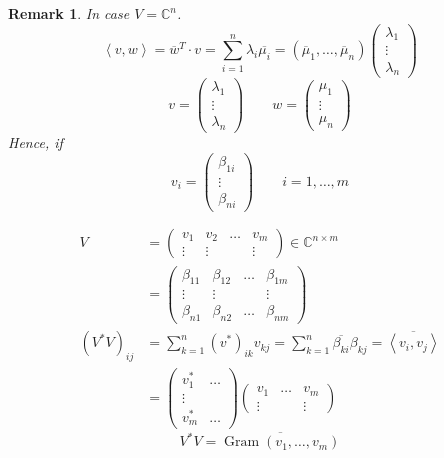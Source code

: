 \documentclass[a4paper]{article}
\newcounter{lecref}[section]
\numberwithin{lecref}{section}
\newtheorem{remark}[lecref]{Remark}
\newcommand{\ip}[2]{\left\langle#1,#2\right\rangle} %
\begin{document}
\begin{remark} %
  In case $V = \mathbb C^n$.
  \[ \ip vw = \overline{w}^T \cdot v = \sum_{i=1}^n \lambda_i \overline{\mu_i} = (\overline \mu_1, \ldots, \overline \mu_n)\begin{pmatrix} \lambda_1 \\ \vdots \\ \lambda_n \end{pmatrix} \]
  \[ v = \begin{pmatrix} \lambda_1 \\ \vdots \\ \lambda_n \end{pmatrix} \qquad w = \begin{pmatrix} \mu_1 \\ \vdots \\ \mu_n \end{pmatrix} \]
  Hence, if
  \[ v_i = \begin{pmatrix} \beta_{1i} \\ \vdots \\ \beta_{ni} \end{pmatrix} \qquad i = 1, \ldots, m \]

  \begin{align*}
    V &= \begin{pmatrix} v_1 & v_2 & \ldots & v_m \\ \vdots & \vdots & & \vdots \end{pmatrix} \in \mathbb C^{n \times m} \\
      &= \begin{pmatrix} \beta_{11} & \beta_{12} & \ldots & \beta_{1m} \\ \vdots & \vdots & & \vdots \\ \beta_{n1} & \beta_{n2} & \ldots & \beta_{nm} \end{pmatrix} \\
    (V^*V)_{ij} &= \sum_{k=1}^n (v^*)_{ik} v_{kj} = \sum_{k=1}^n \overline{\beta_{ki}} \beta_{kj} = \overline{\ip{v_i}{v_j}} \\
      &= \begin{pmatrix} v_1^* & \ldots \\ \vdots & \\ v_m^* & \ldots \end{pmatrix} \begin{pmatrix} v_1 & \ldots & v_m \\ \vdots &  & \vdots \end{pmatrix}
  \end{align*}
  \[ V^* V = \overline{\operatorname{Gram}(v_1, \ldots, v_m)} \]
\end{remark}
\end{document}

